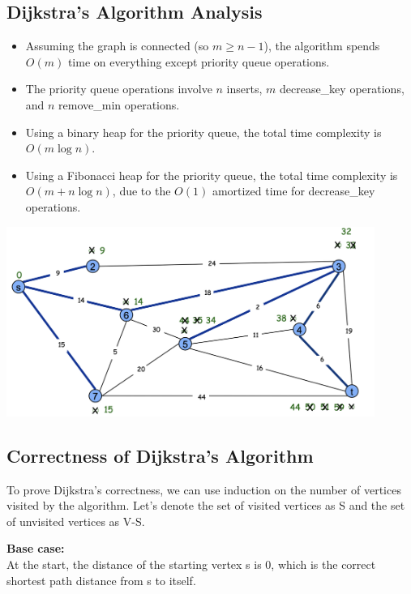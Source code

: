 \documentclass[12pt]{article}
\newcommand{\1}{\space \quad}
\newcommand{\2}{\quad \quad \quad}
\newcommand{\3}{\quad \quad \quad \quad \space}
\newcommand{\4}{\quad \quad \quad \quad \quad \quad}
\newcommand{\5}{\quad \quad \quad \quad \quad \quad \quad \space}
\begin{document}
\subsection{Dijkstra’s Algorithm Analysis}
\begin{itemize}
  \item Assuming the graph is connected (so $m \geq n-1$), the algorithm spends $O(m)$ time on everything except priority queue operations.
  \item The priority queue operations involve $n$ inserts, $m$ decrease\_key operations, and $n$ remove\_min operations.
  \item Using a binary heap for the priority queue, the total time complexity is $O(m \log n)$.
  \item Using a Fibonacci heap for the priority queue, the total time complexity is $O(m + n \log n)$, due to the $O(1)$ amortized time for decrease\_key operations.
\end{itemize}
\begin{center}
  \includegraphics[width=0.9\textwidth]{image20.png}
\end{center}


\subsection{Correctness of Dijkstra’s Algorithm}
To prove Dijkstra’s correctness, we can use induction on the number of vertices visited by the algorithm. 
Let's denote the set of visited vertices as S and the set of unvisited vertices as V-S.

\vspace{10pt}
\textbf{Base case:}\\
At the start, the distance of the starting vertex s is 0, which is the correct shortest path distance from s 
to itself.
\end{document}
